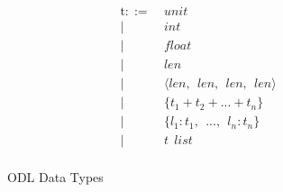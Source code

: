 \begin{figure}
\small
\begin{align*}
\text{t}::=~&unit\\
|~&int\\
|~&float\\
|~&len\\
|~&\langle len, ~~ len, ~~ len, ~~ len\rangle\\
|~&\{t_1 + t_2 + ... + t_n\}\\
|~&\{l_1 : t_1, ~~ ..., ~~ l_n : t_n\}\\
|~&t ~~ list\\
\end{align*}
\caption{ODL Data Types}\label{fig:type}
\end{figure}





